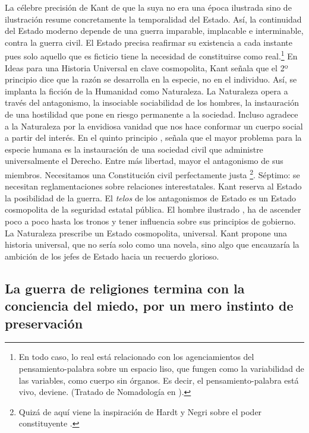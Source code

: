 La célebre precisión de Kant de que la suya no era una época ilustrada sino de ilustración resume concretamente la temporalidad del Estado. Así, la continuidad del Estado moderno depende de una guerra imparable, implacable e interminable, contra la guerra civil. El Estado precisa reafirmar su existencia a cada instante pues solo aquello que es ficticio tiene la necesidad de constituirse como real.\footnote{En todo caso, lo real está relacionado con los agenciamientos del pensamiento-palabra sobre un espacio liso, que fungen como la variabilidad de las variables, como cuerpo sin órganos. Es decir, el pensamiento-palabra está vivo, deviene. (Tratado de Nomadología en \autocite{deleuzeMilMesetasCapitalismo2002}).} En Ideas para una Historia Universal en clave cosmopolita, Kant señala que el 2º principio dice que la razón se desarrolla en la especie, no en el individuo. Así, se implanta la ficción de la Humanidad como Naturaleza. La Naturaleza opera a través del antagonismo, la insociable sociabilidad de los hombres, la instauración de una hostilidad que pone en riesgo permanente a la sociedad. Incluso agradece a la Naturaleza por la envidiosa vanidad que nos hace conformar un cuerpo social a partir del interés. En el quinto principio \autocite[p.10]{kantQueEsIlustracion2009}, señala que el mayor problema para la especie humana es la instauración de una sociedad civil que administre universalmente el Derecho. Entre más libertad, mayor el antagonismo de sus miembros. Necesitamos una Constitución civil perfectamente justa \footnote{Quizá de aquí viene la inspiración de Hardt y Negri sobre el poder constituyente \autocite{hardtImperio2005}.}. Séptimo: se necesitan reglamentaciones sobre relaciones interestatales. Kant reserva al Estado la posibilidad de la guerra. El \emph{telos} de los antagonismos de Estado es un Estado cosmopolita de la seguridad estatal pública. El hombre ilustrado \autocite[p.21]{kantQueEsIlustracion2009}, ha de ascender poco a poco hasta los tronos y tener influencia sobre sus principios de gobierno. La Naturaleza prescribe un Estado cosmopolita, universal. Kant propone una historia universal, que no sería solo como una novela, sino algo que encauzaría la ambición de los jefes de Estado hacia un recuerdo glorioso.

\subsection{La guerra de religiones termina con la conciencia del miedo, por un mero instinto de preservación}
\label{sub:la-guerra-de-religiones-termina}

